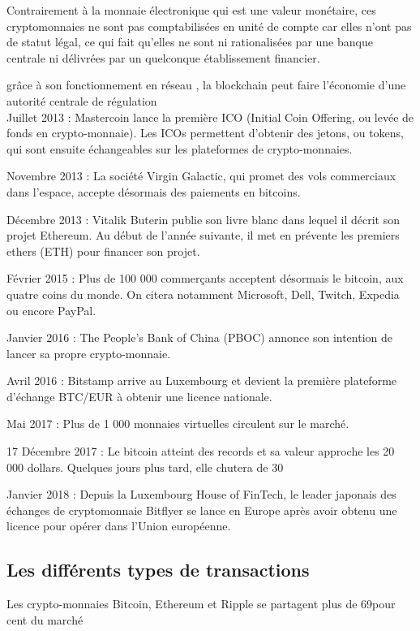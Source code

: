 \documentclass[12pt]{report}
\begin{document}
Contrairement à la monnaie électronique qui est une valeur monétaire, ces cryptomonnaies ne sont pas comptabilisées en unité de compte car elles n'ont pas de statut légal, ce qui fait qu'elles ne sont ni rationalisées par une banque centrale ni délivrées par un quelconque établissement financier.

grâce à son fonctionnement en réseau , la blockchain peut faire l'économie d’une autorité centrale de régulation\\

Juillet 2013 : Mastercoin lance la première ICO (Initial Coin Offering, ou levée de fonds en crypto-monnaie). Les ICOs permettent d’obtenir des jetons, ou tokens, qui sont ensuite échangeables sur les plateformes de crypto-monnaies.

Novembre 2013 : La société Virgin Galactic, qui promet des vols commerciaux dans l’espace, accepte désormais des paiements en bitcoins.

Décembre 2013 : Vitalik Buterin publie son livre blanc dans lequel il décrit son projet Ethereum. Au début de l’année suivante, il met en prévente les premiers ethers (ETH) pour financer son projet.

Février 2015 : Plus de 100 000 commerçants acceptent désormais le bitcoin, aux quatre coins du monde. On citera notamment Microsoft, Dell, Twitch, Expedia ou encore PayPal.

Janvier 2016 : The People’s Bank of China (PBOC) annonce son intention de lancer sa propre crypto-monnaie.

Avril 2016 : Bitstamp arrive au Luxembourg et devient la première plateforme d’échange BTC/EUR à obtenir une licence nationale.

Mai 2017 : Plus de 1 000 monnaies virtuelles circulent sur le marché.

17 Décembre 2017 : Le bitcoin atteint des records et sa valeur approche les 20 000 dollars. Quelques jours plus tard, elle chutera de 30%

Janvier 2018 : Depuis la Luxembourg House of FinTech, le leader japonais des échanges de cryptomonnaie Bitflyer se lance en Europe après avoir obtenu une licence pour opérer dans l’Union européenne.

	\subsection{Les différents types de transactions}
Les crypto-monnaies Bitcoin, Ethereum et Ripple se partagent plus de 69pour cent du marché
\end{document}
